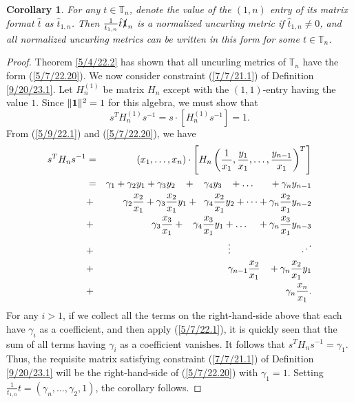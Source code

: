 \documentclass{amsart}
\numberwithin{equation}{section}
\newtheorem{corollary}[theorem]{Corollary}
\theoremstyle{definition}
\numberwithin{theorem}{section}
\begin{document}
\begin{corollary}\label{7/1/22.1} For any $t\in \mathbb{T}_n$, denote the value of the $(1,n)$ entry of its matrix format $\hat{t}$ as $\hat{t}_{1,n}$.  Then $\frac{1}{t_{1,n}}\hat{t}\slashed{\bf 1}_n$ is a normalized uncurling metric if $\hat{t}_{1,n}\ne 0$, and all normalized uncurling metrics can be written in this form for some $t\in \mathbb{T}_n$. \end{corollary}
\begin{proof} Theorem \ref{5/4/22.2} has shown that all uncurling metrics of $\mathbb{T}_n$ have the form (\ref{5/7/22.20}).
We now consider constraint (\ref{7/7/21.1}) of Definition \ref{9/20/23.1}.  Let $H_n^{(1)}$ be matrix $H_n$ except with the  $(1,1)$-entry having the value $1$.
Since $\|{\bf 1}\|^2 =1$ for this algebra, we must show that \[ s^T H_n^{(1)} s^{-1} = s\cdot [H_n^{(1)}s^{-1}] = 1.\]  From (\ref{5/9/22.1}) and (\ref{5/7/22.20}), we have
\begin{eqnarray}\nonumber s^T H_n s^{-1} &=& (x_1,\dots,x_n)\cdot \left[ H_n \left(\frac{1}{x_1}, \frac{y_1}{x_1},\dots,\frac{y_{n-1}}{x_1}\right)^T\right] \\ 
 &=&  \gamma_1 + \gamma_2y_1 + \gamma_3y_2 \hspace{3mm} + \hspace{3mm}\gamma_4y_3 \hspace{3mm} + \dots   \hspace{6mm}+\gamma_ny_{n-1} \nonumber \\
&+&  \gamma_2 \frac{x_2}{x_1} + \gamma_3\frac{x_2}{x_1}y_1 + \hspace{2mm} \gamma_4\frac{x_2}{x_1}y_2 + \dots +  \gamma_n\frac{x_2}{x_1}y_{n-2} \nonumber \\ &+&\gamma_3 \frac{x_3}{x_1}  + \hspace{3mm}\gamma_4\frac{x_3}{x_1}y_1 +  \dots \hspace{4mm} +  \gamma_n\frac{x_3}{x_1}y_{n-3} \nonumber \\ 
&+&  \hspace{5mm} \vdots \hspace{2.5cm} \iddots \bigskip\bigskip \nonumber \\ &+& \gamma_{n-1} \frac{x_2}{x_1} \hspace{3mm} + \gamma_n \frac{x_2}{x_1}y_1 \nonumber \\ &+& \hspace{2mm} \gamma_n\frac{x_n}{x_1}. \label{6/23/22.1}
 \end{eqnarray}
 For any $i>1$, if we collect all the terms on the right-hand-side above that each have $\gamma_i$ as a coefficient, and then apply (\ref{5/7/22.1}), it is quickly seen that the sum of all terms having $\gamma_i$ as a coefficient vanishes.  It follows that
 $s^T H_n s^{-1} =\gamma_1$.   Thus, the requisite matrix satisfying constraint (\ref{7/7/21.1}) of Definition \ref{9/20/23.1} will be the right-hand-side of (\ref{5/7/22.20}) with $\gamma_1=1$.  Setting $\frac{1}{t_{1,n}}t = (\gamma_n,\dots,\gamma_2, 1)$, the corollary follows.
\end{proof}
\end{document}
